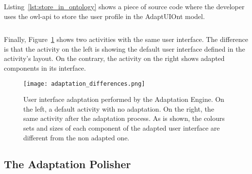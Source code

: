 \inputminted[linenos=true, fontsize=\footnotesize, frame=lines]{java}{4_system_architecture/redraw.java}


Listing~\ref{lst:store_in_ontology} shows a piece of source code where the developer
uses the \ac{owl}-\ac{api} to store the user profile in the AdaptUIOnt model. 

\inputminted[linenos=true, fontsize=\footnotesize, frame=lines]{java}{4_system_architecture/store_in_ontology.java}


Finally, Figure~\ref{fig:adaptation_differences} shows two activities with the
same user interface. The difference is that the activity on the left is showing
the default user interface defined in the activity's layout. On the contrary,
the activity on the right shows adapted components in its interface.

\begin{figure}[H]
\centering
\texttt{[image: adaptation\_differences.png]}
\caption{User interface adaptation performed by the Adaptation Engine. On the
left, a default activity with no adaptation. On the right, the same activity
after the adaptation process. As is shown, the colours sets and sizes of each
component of the adapted user interface are different from the non adapted one.}
\label{fig:adaptation_differences}
\end{figure}


\subsection{The Adaptation Polisher}
\label{sec:adaptation_polisher}

